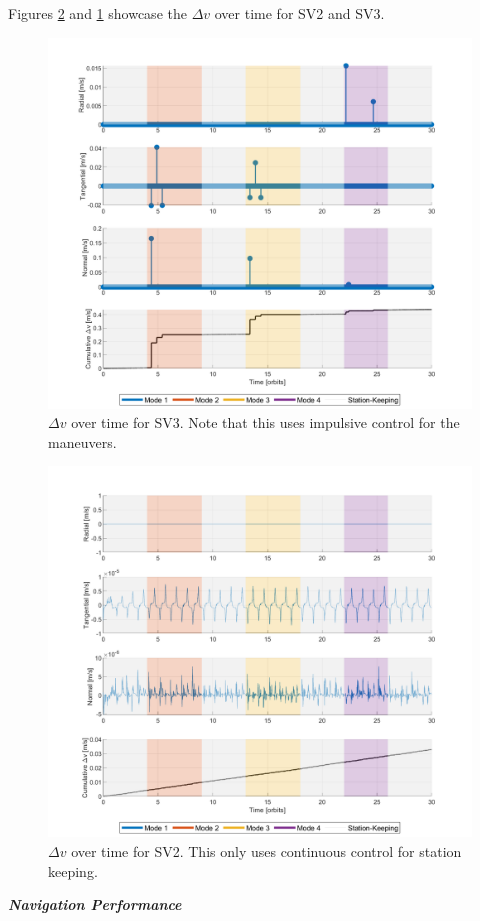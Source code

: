 Figures \ref{fig:delta_v_cumulative_sv2} and \ref{fig:delta_v_cumulative_sv3} showcase the $\Delta v$ over time for SV2 and SV3.  
\begin{figure}[H]
    \centering
    \includegraphics[width=0.7\linewidth]{sim/figures/PS9/delta_v_cumulative_timeline_modes_SV3.png}
    \caption{$\Delta v$ over time for SV3. Note that this uses impulsive control for the maneuvers.}
    \label{fig:delta_v_cumulative_sv3}
\end{figure}

\begin{figure}[H]
    \centering
    \includegraphics[width=0.7\linewidth]{sim/figures/PS9/delta_v_cumulative_timeline_modes_SV2.png}
    \caption{$\Delta v$ over time for SV2. This only uses continuous control for station keeping.}
    \label{fig:delta_v_cumulative_sv2}
\end{figure}

\textbf{\textit{Navigation Performance}}


